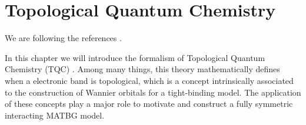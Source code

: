 



\chapter{Topological Quantum Chemistry}

We are following the references \cite{lectures_tms2017, building_blocks2018}.

In this chapter we will introduce the formalism of Topological Quantum Chemistry (TQC) \cite{topological_quantum_chemistry2017}. Among many things, this theory mathematically defines when a electronic band is topological, which is a concept intrinsically associated to the construction of Wannier orbitals for a tight-binding model. The application of these concepts play a major role to motivate and construct a fully symmetric interacting MATBG model.

